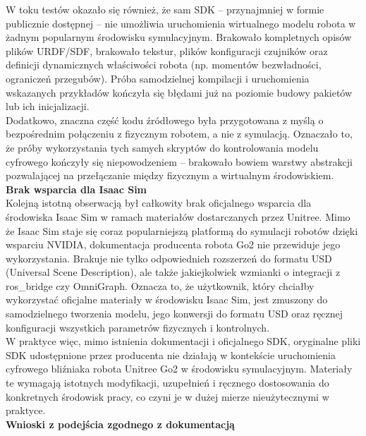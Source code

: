\documentclass[12pt]{article}
\begin{document}
\noindent W toku testów okazało się również, że sam SDK – przynajmniej w formie publicznie dostępnej – nie umożliwia uruchomienia wirtualnego modelu robota w żadnym popularnym środowisku symulacyjnym. Brakowało kompletnych opisów plików URDF/SDF, brakowało tekstur, plików konfiguracji czujników oraz definicji dynamicznych właściwości robota (np. momentów bezwładności, ograniczeń przegubów). Próba samodzielnej kompilacji i uruchomienia wskazanych przykładów kończyła się błędami już na poziomie budowy pakietów lub ich inicjalizacji.\\

\noindent Dodatkowo, znaczna część kodu źródłowego była przygotowana z myślą o bezpośrednim połączeniu z fizycznym robotem, a nie z symulacją. Oznaczało to, że próby wykorzystania tych samych skryptów do kontrolowania modelu cyfrowego kończyły się niepowodzeniem – brakowało bowiem warstwy abstrakcji pozwalającej na przełączanie między fizycznym a wirtualnym środowiskiem.\\

\noindent \textbf{Brak wsparcia dla Isaac Sim}\\

\noindent Kolejną istotną obserwacją był całkowity brak oficjalnego wsparcia dla środowiska Isaac Sim w ramach materiałów dostarczanych przez Unitree. Mimo że Isaac Sim staje się coraz popularniejszą platformą do symulacji robotów dzięki wsparciu NVIDIA, dokumentacja producenta robota Go2 nie przewiduje jego wykorzystania. Brakuje nie tylko odpowiednich rozszerzeń do formatu USD (Universal Scene Description), ale także jakiejkolwiek wzmianki o integracji z ros\_bridge czy OmniGraph. Oznacza to, że użytkownik, który chciałby wykorzystać oficjalne materiały w środowisku Isaac Sim, jest zmuszony do samodzielnego tworzenia modelu, jego konwersji do formatu USD oraz ręcznej konfiguracji wszystkich parametrów fizycznych i kontrolnych.\\

\noindent W praktyce więc, mimo istnienia dokumentacji i oficjalnego SDK, oryginalne pliki SDK udostępnione przez producenta nie działają w kontekście uruchomienia cyfrowego bliźniaka robota Unitree Go2 w środowisku symulacyjnym. Materiały te wymagają istotnych modyfikacji, uzupełnień i ręcznego dostosowania do konkretnych środowisk pracy, co czyni je w dużej mierze nieużytecznymi w praktyce.\\

\noindent \textbf{Wnioski z podejścia zgodnego z dokumentacją}\\
\end{document}
